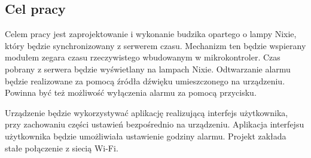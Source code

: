 \documentclass[../main.tex]{subfiles}
\begin{document}
 \subsection{Cel pracy}
 Celem pracy jest zaprojektowanie i wykonanie budzika opartego o lampy Nixie, który będzie synchronizowany z serwerem
  czasu. Mechanizm ten będzie wspierany modułem zegara czasu rzeczywistego wbudowanym w mikrokontroler. 
  Czas pobrany z serwera będzie wyświetlany na lampach Nixie. Odtwarzanie alarmu będzie realizowane za pomocą 
  źródła dźwięku umieszczonego na urządzeniu. Powinna być też możliwość wyłączenia alarmu za pomocą przycisku.
 
 Urządzenie będzie wykorzystywać aplikację realizującą interfejs użytkownika, przy zachowaniu części ustawień 
 bezpośrednio na urządzeniu. Aplikacja interfejsu użytkownika będzie umożliwiała ustawienie godziny alarmu. 
 Projekt zakłada stałe połączenie z siecią Wi-Fi.
 
 
\end{document}
